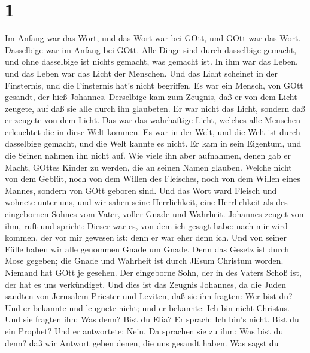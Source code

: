 \hypertarget{section}{%
\section{1}\label{section}}

 Im Anfang war das Wort, und das Wort war bei GOtt, und GOtt
war das Wort.  Dasselbige war im Anfang bei GOtt.
 Alle Dinge sind durch dasselbige gemacht, und ohne
dasselbige ist nichts gemacht, was gemacht ist.  In ihm war
das Leben, und das Leben war das Licht der Menschen.  Und
das Licht scheinet in der Finsternis, und die Finsternis hat's nicht
begriffen.  Es war ein Mensch, von GOtt gesandt, der hieß
Johannes.  Derselbige kam zum Zeugnis, daß er von dem Licht
zeugete, auf daß sie alle durch ihn glaubeten.  Er war nicht
das Licht, sondern daß er zeugete von dem Licht.  Das war
das wahrhaftige Licht, welches alle Menschen erleuchtet die in diese
Welt kommen.  Es war in der Welt, und die Welt ist durch
dasselbige gemacht, und die Welt kannte es nicht.  Er kam
in sein Eigentum, und die Seinen nahmen ihn nicht auf.  Wie
viele ihn aber aufnahmen, denen gab er Macht, GOttes Kinder zu werden,
die an seinen Namen glauben.  Welche nicht von dem Geblüt,
noch von dem Willen des Fleisches, noch von dem Willen eines Mannes,
sondern von GOtt geboren sind.  Und das Wort ward Fleisch
und wohnete unter uns, und wir sahen seine Herrlichkeit, eine
Herrlichkeit als des eingebornen Sohnes vom Vater, voller Gnade und
Wahrheit.  Johannes zeuget von ihm, ruft und spricht:
Dieser war es, von dem ich gesagt habe: nach mir wird kommen, der vor
mir gewesen ist; denn er war eher denn ich.  Und von seiner
Fülle haben wir alle genommen Gnade um Gnade.  Denn das
Gesetz ist durch Mose gegeben; die Gnade und Wahrheit ist durch JEsum
Christum worden.  Niemand hat GOtt je gesehen. Der
eingeborne Sohn, der in des Vaters Schoß ist, der hat es uns
verkündiget.  Und dies ist das Zeugnis Johannes, da die
Juden sandten von Jerusalem Priester und Leviten, daß sie ihn fragten:
Wer bist du?  Und er bekannte und leugnete nicht; und er
bekannte: Ich bin nicht Christus.  Und sie fragten ihn: Was
denn? Bist du Elia? Er sprach: Ich bin's nicht. Bist du ein Prophet? Und
er antwortete: Nein.  Da sprachen sie zu ihm: Was bist du
denn? daß wir Antwort geben denen, die uns gesandt haben. Was sagst du
